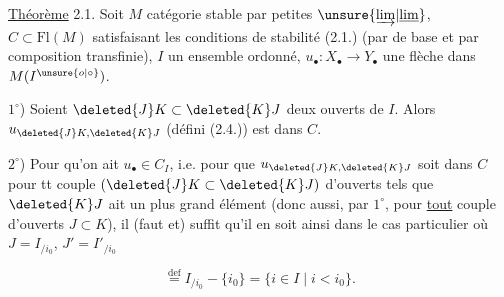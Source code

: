 

\uline{Théorème} 2.1. Soit $M$ catégorie stable par petites $\unsure{\underrightarrow{\lim}|\underline{\lim}}$, $C\subset\mathrm{Fl}(M)$ satisfaisant les conditions de stabilité (2.1.) (par  de base et par composition transfinie), $I$ un  ensemble ordonné, $u_\bullet:X_\bullet\longrightarrow Y_\bullet$ une flèche dans $M(I^{\unsure{o|\circ}})$. 

$1^\circ$)  Soient $\deleted{J}K\subset\deleted{K}J$ deux ouverts de $I$. Alors $u_{\deleted{J}K,\deleted{K}J}$ (défini  (2.4.)) est dans $C$.

$2^\circ$)  Pour qu'on ait $u_\bullet\in C_I$, i.e. pour que $u_{\deleted{J}K,\deleted{K}J}$ soit dans $C$ pour tt couple $(\deleted{J}K\subset\deleted{K}J)$ d'ouverts tels que $\deleted{K}J$ ait un plus grand élément  (donc aussi, par $1^\circ$, pour \uline{tout} couple d'ouverts $J\subset K$), il (faut et) suffit qu'il en soit ainsi dans le cas particulier où $J=I_{/i_0}$, $J'=I'_{/i_0}$

\[
 \overset{\mathrm{def}}{=} I_{/i_0}-\{i_0\}=\{i\in I\mid i<i_0\}.
\]


